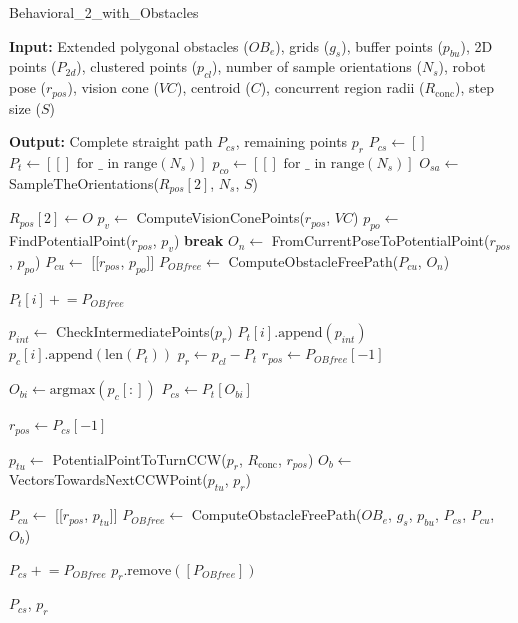 \begin{algorithm}[H]
    \caption{Behavioral\_2\_with\_Obstacles}
    \label{alg:behavioral_algorithm_2_obs}
    \begin{algorithmic}[1]

    \Statex \textbf{Input:} Extended polygonal obstacles ($OB_e$), grids ($g_s$), buffer points ($p_{bu}$), 2D points ($P_{2d}$), clustered points ($p_{cl}$), number of sample orientations ($N_s$), robot pose ($r_{pos}$), vision cone ($VC$), centroid ($C$), concurrent region radii ($R_{\text{conc}}$), step size ($S$)

    \Statex \textbf{Output:} Complete straight path $P_{cs}$, remaining points $p_r$
    \newline
    \State $P_{cs} \leftarrow []$
    \State $P_t \leftarrow [[] \text{ for } \_ \text{ in range}(N_s)]$
    \State $p_{co} \leftarrow [[] \text{ for } \_ \text{ in range}(N_s)]$
    \State $O_{sa} \leftarrow$ SampleTheOrientations($R_{pos}[2]$, $N_s$, $S$)
    
        \State $R_{pos}[2] \leftarrow O$
            \State $p_v \leftarrow$ ComputeVisionConePoints($r_{pos}$, $VC$)
            \State $p_{po} \leftarrow$ FindPotentialPoint($r_{pos}$, $p_v$)
                \State \textbf{break}
            \EndIf
            \State $O_n \leftarrow$ FromCurrentPoseToPotentialPoint($r_{pos}$, $p_{po}$)
            \State $P_{cu} \leftarrow$ [[$r_{pos}$, $p_{po}$]]
            \State $P_{OB free} \leftarrow$ ComputeObstacleFreePath($P_{cu}$, $O_n$)


            \State $P_t[i] \mathrel{+}= P_{OB free}$
            
            \State $p_{int} \leftarrow$ CheckIntermediatePoints($p_r$)
            \State $P_t[i].\text{append}(p_{int})$
            \State $p_c[i].\text{append}(\text{len}(P_t))$
            \State $p_r \leftarrow p_{cl} - P_t$
            \State $r_{pos} \leftarrow P_{OB free}[-1]$
        \EndWhile
    \EndFor
    
    \State $O_{bi} \leftarrow \text{argmax}(p_c[:])$
    \State $P_{cs} \leftarrow P_t[O_{bi}]$
    
    \State $r_{pos} \leftarrow P_{cs}[-1]$

    \State $p_{tu} \leftarrow$ PotentialPointToTurnCCW($p_r$, $R_{\text{conc}}$, $r_{pos}$)
    \State $O_b \leftarrow$ VectorsTowardsNextCCWPoint($p_{tu}$, $p_r$)


    \State $P_{cu} \leftarrow$ [[$r_{pos}$, $p_{tu}$]]
    \State $P_{OB free} \leftarrow$ ComputeObstacleFreePath($OB_e$, $g_s$, $p_{bu}$, $P_{cs}$, $P_{cu}$, $O_b$)

    \State $P_{cs} \mathrel{+}= P_{OB free}$
    \State $p_r.\text{remove}([P_{OB free}])$ 
    
    \State \Return $P_{cs}$, $p_r$
    \end{algorithmic}
    \end{algorithm}

